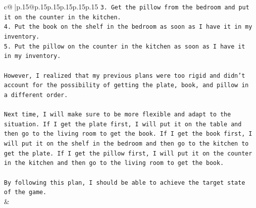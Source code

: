 \documentclass{article}
\begin{document}
{\begin{supertabular}{c@{$\;$}|p{.15\linewidth}@{}p{.15\linewidth}p{.15\linewidth}p{.15\linewidth}p{.15\linewidth}p{.15\linewidth}}
{{{\texttt{3. Get the pillow from the bedroom and put it on the counter in the kitchen.} \\
\texttt{4. Put the book on the shelf in the bedroom as soon as I have it in my inventory.} \\
\texttt{5. Put the pillow on the counter in the kitchen as soon as I have it in my inventory.} \\
\\ 
\texttt{However, I realized that my previous plans were too rigid and didn't account for the possibility of getting the plate, book, and pillow in a different order. } \\
\\ 
\texttt{Next time, I will make sure to be more flexible and adapt to the situation. If I get the plate first, I will put it on the table and then go to the living room to get the book. If I get the book first, I will put it on the shelf in the bedroom and then go to the kitchen to get the plate. If I get the pillow first, I will put it on the counter in the kitchen and then go to the living room to get the book.} \\
\\ 
\texttt{By following this plan, I should be able to achieve the target state of the game.} \\
            }
        }
    }
    & \\ \\

\end{supertabular}
}
\end{document}
